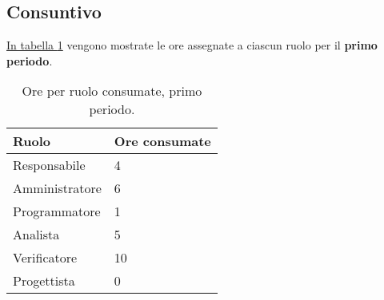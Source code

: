 \subsection{Consuntivo}

\label{sec:Consuntivo_PrimoPeriodo}

\hyperref[tab:consuntivo_primo_periodo]{In tabella \ref{tab:consuntivo_primo_periodo}} vengono mostrate le ore assegnate a ciascun ruolo per il \textbf{primo periodo}.
\begin{table}[H]
    \centering
    \begin{tabular}{| l | l |}
    \hline
        \textbf{Ruolo} & 
        \textbf{Ore consumate}\\
    \hline
        Responsabile & 4\\
    \hline
        Amministratore & 6\\
    \hline
        Programmatore & 1\\
    \hline
        Analista & 5\\
    \hline
        Verificatore & 10\\
    \hline
        Progettista & 0\\
    \hline
    \end{tabular}
    \caption{Ore per ruolo consumate, primo periodo.}
    \label{tab:consuntivo_primo_periodo} 
\end{table}
